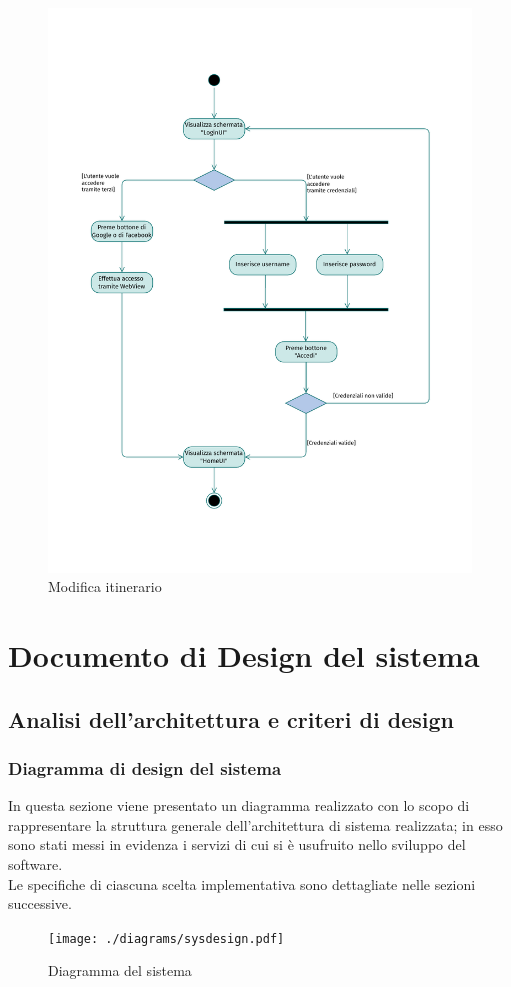 \documentclass{natourDoc}
\begin{document}
\newpage
\begin{figure}[!htbp]
	\centering
	\includegraphics[width=\textwidth, page=19]{./diagrams/activity.pdf}
	\caption{Modifica itinerario}
\end{figure}
\FloatBarrier

\newpage
\section{Documento di Design del sistema}
\subsection{Analisi dell'architettura e criteri di design}
\subsubsection{Diagramma di design del sistema}
In questa sezione viene presentato un diagramma realizzato con lo scopo di 
rappresentare la struttura generale dell'architettura di sistema realizzata; 
in esso sono stati messi in evidenza i servizi di cui si è usufruito nello sviluppo del software. \\
Le specifiche di ciascuna scelta implementativa sono
dettagliate nelle sezioni successive.
\begin{figure}[!htbp]
	\centering
	\texttt{[image: ./diagrams/sysdesign.pdf]}
	\caption{Diagramma del sistema}
\end{figure}
\end{document}
